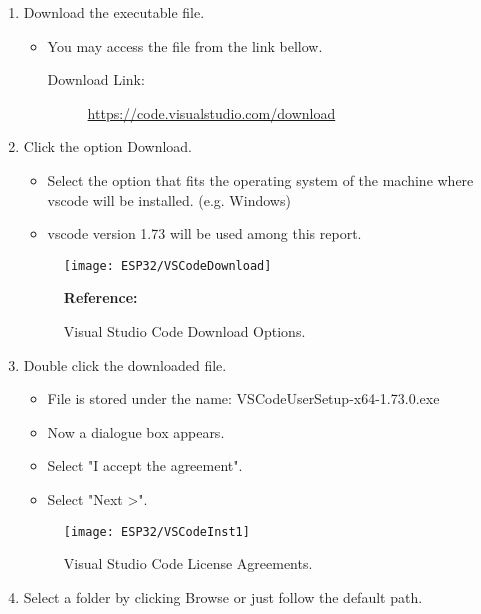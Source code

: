 \begin{enumerate}
    \item Download the executable file.
    \begin{itemize}
        \item You may access the file from the link bellow.
        \begin{description}
            \item[Download Link:] \url{https://code.visualstudio.com/download}
        \end{description}
    \end{itemize}
    \item Click the option Download.
    \begin{itemize}
        \item Select the option that fits the operating system of the machine where \ac{vscode} will be installed. (e.g. Windows) 
        \item \ac{vscode} version 1.73 will be used among this report.
    \end{itemize}
    \begin{figure}  [H]
        \begin{center}
            \texttt{[image: ESP32/VSCodeDownload]}
            \caption{Visual Studio Code Download Options.} 
            \label{fig:Visual Studio Code Download Options.}
            \footnotesize \textbf{Reference:} \cite{Microsoft:2022}
        \end{center}
    \end{figure}
    \item Double click the downloaded file.
    \begin{itemize}
        \item File is stored under the name: VSCodeUserSetup-x64-1.73.0.exe
        \item Now a dialogue box appears.
        \item Select "I accept the agreement".
        \item Select "Next >".
    \end{itemize}
    \begin{figure}  [H]
        \begin{center}
            \texttt{[image: ESP32/VSCodeInst1]}
            \caption{Visual Studio Code License Agreements.} 
            \label{fig:Visual Studio Code License Agreements.}
        \end{center}
    \end{figure}
    \item Select a folder by clicking Browse or just follow the default path.

\end{enumerate}
